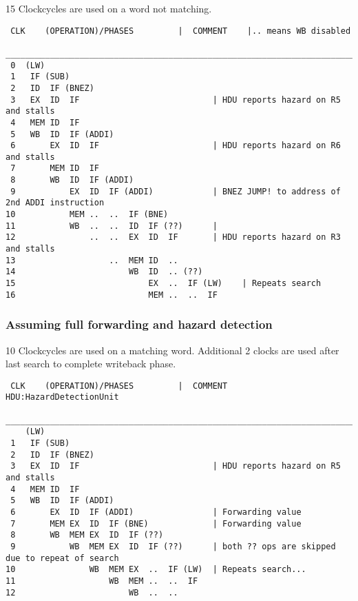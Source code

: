 \documentclass[a4paper,10pt]{article}
\begin{document}
15 Clockcycles are used on a word not matching.
\begin{verbatim}
 CLK    (OPERATION)/PHASES         |  COMMENT    |.. means WB disabled
 ________________________________________________________________________________________________
 0  (LW)  
 1   IF (SUB)
 2   ID  IF (BNEZ) 
 3   EX  ID  IF                           | HDU reports hazard on R5 and stalls
 4   MEM ID  IF     
 5   WB  ID  IF (ADDI)
 6       EX  ID  IF                       | HDU reports hazard on R6 and stalls
 7       MEM ID  IF    
 8       WB  ID  IF (ADDI)
 9           EX  ID  IF (ADDI)            | BNEZ JUMP! to address of 2nd ADDI instruction
10           MEM ..  ..  IF (BNE)
11           WB  ..  ..  ID  IF (??)      | 
12               ..  ..  EX  ID  IF       | HDU reports hazard on R3 and stalls
13                   ..  MEM ID  ..  
14                       WB  ID  .. (??)
15                           EX  ..  IF (LW)    | Repeats search
16                           MEM ..  ..  IF
\end{verbatim}




\newpage

\subsubsection{Assuming full forwarding and hazard detection}

10 Clockcycles are used on a matching word. Additional 2 clocks are used after last search to complete writeback phase.
\begin{verbatim}
 CLK    (OPERATION)/PHASES         |  COMMENT   HDU:HazardDetectionUnit
 ________________________________________________________________________________________________
    (LW)  
 1   IF (SUB)
 2   ID  IF (BNEZ) 
 3   EX  ID  IF                           | HDU reports hazard on R5 and stalls
 4   MEM ID  IF     
 5   WB  ID  IF (ADDI)
 6       EX  ID  IF (ADDI)                | Forwarding value
 7       MEM EX  ID  IF (BNE)             | Forwarding value
 8       WB  MEM EX  ID  IF (??)
 9           WB  MEM EX  ID  IF (??)      | both ?? ops are skipped due to repeat of search
10               WB  MEM EX  ..  IF (LW)  | Repeats search...
11                   WB  MEM ..  ..  IF    
12                       WB  ..  ..
\end{verbatim}
\end{document}
